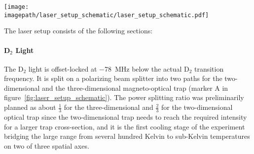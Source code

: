 \begin{sidewaysfigure}
    \centering
    \texttt{[image: \\imagepath/laser\_setup\_schematic/laser\_setup\_schematic.pdf]}
    \caption{Schematic of the laser setup for preparing the cooling light for the magneto-optical traps and the gray molasses: D$_2$ light is split into two branches for the two-dimensional (to the right) and the three-dimensional magneto-optical (to the bottom) traps at the first PBS (A).\\
    For the light for the two-dimensional trap, a small amount of power is taken out for the push beam (B) before it is split into cooler and repumper light (C) and frequency-shifted by \SI[]{+-114}{\mega\hertz} on acousto-optic modulators. It is then recombined (D) and split into two outputs (E). It is considered to add an electro-optical modulator (EOM) for improving the cooling effect of the light. This part of the laser setup was constructed within the scope of this thesis (gray box).\\
    The light for the three-dimensional trap and the D$_1$ light for the gray molasses are spatially overlapped (F), split into cooler and repumper (G) and frequency-shifted by  \SI[]{+162}{\mega\hertz} and \SI[]{+390}{\mega\hertz} respectively on acousto-optic modulator double passes, recombined (H), and then split into three outputs (I).\\
    Small amounts of power of both input laser beams are split off for locking on offset locks. A small amount of light for the three-dimensional magneto-optical trap and the gray molasses is split off for monitoring the light frequencies on a cavity.\\
    HWP and QWP stand for half- and quarter-wave plate respectively. The numbers in \si[]{\milli\watt} next to the beam lines are target powers assuming optimally working laser sources.}
    \label{fig:laser_setup_schematic}
\end{sidewaysfigure}

The laser setup consists of the following sections:

\paragraph{D$_\textsf{2}$ Light} The D$_2$ light is offset-locked at \SI{-78}{\mega\hertz} below the actual D$_2$ transition frequency. It is split on a polarizing beam splitter into two paths for the two-dimensional and the three-dimensional magneto-optical trap (marker A in figure~\ref{fig:laser_setup_schematic}). The power splitting ratio was preliminarily planned as about $\frac{1}{3}$ for the three-dimensional and $\frac{2}{3}$ for the two-dimensional optical trap since the two-dimensional trap needs to reach the required intensity for a larger trap cross-section, and it is the first cooling stage of the experiment bridging the large range from several hundred Kelvin to sub-Kelvin temperatures on two of three spatial axes.

